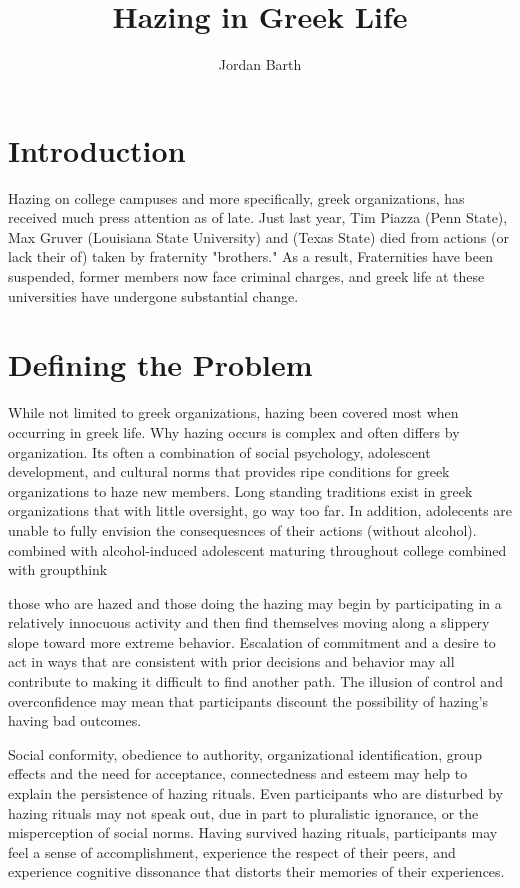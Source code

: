 \documentclass[12pt]{amsart}
\title{Hazing in Greek Life}
\author{Jordan Barth}
\date
\begin{document}
\maketitle

\section{Introduction}

Hazing on college campuses and more specifically, greek organizations, has received much press attention as of late. Just last year, Tim Piazza (Penn State), Max Gruver (Louisiana State University) and (Texas State) died from actions (or lack their of) taken by fraternity "brothers." As a result, Fraternities have been suspended, former members now face criminal charges, and greek life at these universities have undergone substantial change. 

\section{Defining the Problem}

While not limited to greek organizations, hazing been covered most when occurring in greek life. Why hazing occurs is complex and often differs by organization. Its often a combination of social psychology, adolescent development, and cultural norms that provides ripe conditions for greek organizations to haze new members. Long standing traditions exist in greek organizations that with little oversight, go way too far. In addition, adolecents are unable to fully envision the consequesnces of their actions (without alcohol). combined with alcohol-induced adolescent maturing throughout college combined with groupthink

those who are hazed and those doing the hazing may begin by participating in a relatively innocuous activity and then find themselves moving along a slippery slope toward more extreme behavior. Escalation of commitment and a desire to act in ways that are consistent with prior decisions and behavior may all contribute to making it difficult to find another path. The illusion of control and overconfidence may mean that participants discount the possibility of hazing's having bad outcomes.

Social conformity, obedience to authority, organizational identification, group effects and the need for acceptance, connectedness and esteem may help to explain the persistence of hazing rituals. Even participants who are disturbed by hazing rituals may not speak out, due in part to pluralistic ignorance, or the misperception of social norms. Having survived hazing rituals, participants may feel a sense of accomplishment, experience the respect of their peers, and experience cognitive dissonance that distorts their memories of their experiences.
\end{document}
